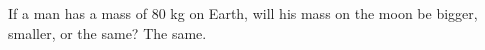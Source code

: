 {If a man has a mass of 80 kg on Earth, will his mass on the moon be bigger, smaller, or the same?}
{The same.}
